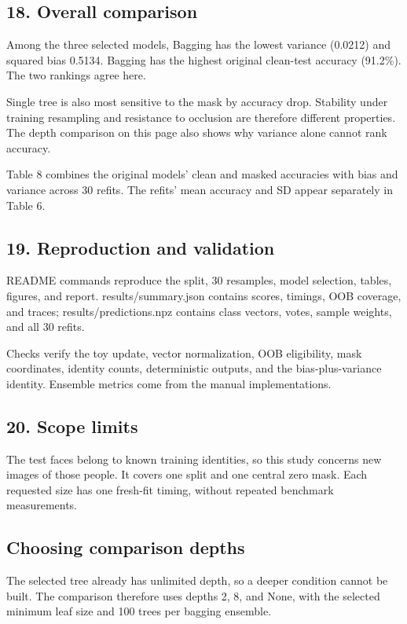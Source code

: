 \documentclass[10pt,twocolumn,letterpaper]{article}
\begin{document}
\subsection*{18. Overall comparison}
Among the three selected models, Bagging has the lowest variance (0.0212) and squared bias 0.5134. Bagging has the highest original clean-test accuracy (91.2\%). The two rankings agree here.

Single tree is also most sensitive to the mask by accuracy drop. Stability under training resampling and resistance to occlusion are therefore different properties. The depth comparison on this page also shows why variance alone cannot rank accuracy.

Table 8 combines the original models' clean and masked accuracies with bias and variance across 30 refits. The refits' mean accuracy and SD appear separately in Table 6.

\subsection*{19. Reproduction and validation}
README commands reproduce the split, 30 resamples, model selection, tables, figures, and report. results/summary.json contains scores, timings, OOB coverage, and traces; results/predictions.npz contains class vectors, votes, sample weights, and all 30 refits.

Checks verify the toy update, vector normalization, OOB eligibility, mask coordinates, identity counts, deterministic outputs, and the bias-plus-variance identity. Ensemble metrics come from the manual implementations.

\subsection*{20. Scope limits}
The test faces belong to known training identities, so this study concerns new images of those people. It covers one split and one central zero mask. Each requested size has one fresh-fit timing, without repeated benchmark measurements.

\newpage
\subsection*{Choosing comparison depths}
The selected tree already has unlimited depth, so a deeper condition cannot be built. The comparison therefore uses depths 2, 8, and None, with the selected minimum leaf size and 100 trees per bagging ensemble.
\end{document}

